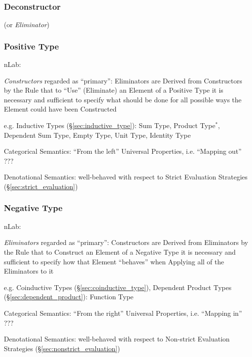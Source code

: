 \subsubsection{Deconstructor}\label{sec:deconstructor}

(or \emph{Eliminator})



\subsubsection{Positive Type}\label{sec:positive_type}

nLab:

\emph{Constructors} regarded as ``primary'': Eliminators are Derived
from Constructors by the Rule that to ``Use'' (Eliminate) an Element
of a Positive Type it is necessary and sufficient to specify what
should be done for all possible ways the Element could have been
Constructed

e.g. Inductive Types (\S\ref{sec:inductive_type}): Sum Type, Product
Type$^*$, Dependent Sum Type, Empty Type, Unit Type, Identity Type

Categorical Semantics: ``From the left'' Universal Properties, i.e.
``Mapping out'' ???

Denotational Semantics: well-behaved with respect to Strict Evaluation
Strategies (\S\ref{sec:strict_evaluation})



\subsubsection{Negative Type}\label{sec:negative_type}

nLab:

\emph{Eliminators} regarded as ``primary'': Constructors are Derived
from Eliminators by the Rule that to Construct an Element of a
Negative Type it is necessary and sufficient to specify how that
Element ``behaves'' when Applying all of the Eliminators to it

e.g. Coinductive Types (\S\ref{sec:coinductive_type}), Dependent
Product Types (\S\ref{sec:dependent_product}): Function Type

Categorical Semantics: ``From the right'' Universal Properties, i.e.
``Mapping in'' ???

Denotational Semantics: well-behaved with respect to Non-strict
Evaluation Strategies (\S\ref{sec:nonstrict_evaluation})



